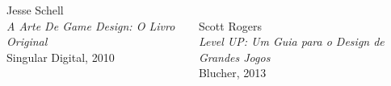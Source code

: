\expandafter\documentclass\expandafter[table, usenames, svgnames, dvipsnames, \classopts]{beamer}
\newcommand{\referencesbegin}{
   \newcounter{framenumberappendix}
   \setcounter{framenumberappendix}{\value{framenumber}}
}
\newcommand{\referencesend}{
   \addtocounter{framenumberappendix}{-\value{framenumber}}
   \addtocounter{framenumber}{\value{framenumberappendix}} 
}
\begin{document}
\begin{frame}
\begin{columns}[c]
\begin{center}
				Jesse Schell\\
				\textit{A Arte De Game Design: O Livro Original}\\
				Singular Digital, 2010
			\end{center}
			\begin{center}
				\\
				Scott Rogers\\
				\textit{Level UP: Um Guia para o Design de Grandes Jogos}\\
				Blucher, 2013
			\end{center}
	\end{columns}		
	
\end{frame}




%	


\end{document}
